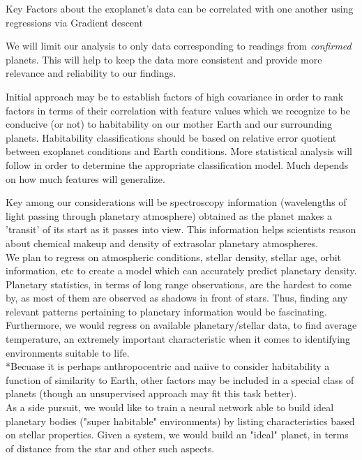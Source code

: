 \documentclass[12pt]{article}
\begin{document}
Key Factors about the exoplanet's data can be correlated with one another using regressions via Gradient descent

We will limit our analysis to only data corresponding to readings from \emph{confirmed} planets. This will help to keep the data more consistent and provide more relevance and reliability to our findings.

Initial approach may be to establish factors of high covariance in order to rank factors in terms of their correlation with feature values which we recognize to be conducive (or not) to habitability on our mother Earth and our surrounding planets. Habitability classifications should be based on relative error quotient between exoplanet conditions and Earth conditions. More statistical analysis will follow in order to determine the appropriate classification model. Much depends on how much  features will generalize.

Key among our considerations will be spectroscopy information (wavelengths of light passing through planetary atmosphere) obtained as the planet makes a 'transit' of its start as it passes into view. This information helps scientists reason about chemical makeup and density of extrasolar planetary atmospheres.
\\
\indent We plan to regress on atmospheric conditions, stellar density, stellar age, orbit information, etc to create a model which can accurately predict planetary density. Planetary statistics, in terms of long range observations, are the hardest to come by, as most of them are observed as shadows in front of stars. Thus, finding any relevant patterns pertaining to planetary information would be fascinating. \\
\indent Furthermore, we would regress on available planetary/stellar data, to find average temperature, an extremely important characteristic when it comes to identifying environments suitable to life. 
\\


*Becuase it is perhaps anthropocentric and naiive to consider habitability a function of similarity to Earth, other factors may be included in a special class of planets (though an unsupervised approach may fit this task better). \\
\indent As a side pursuit, we would like to train a neural network able to build ideal planetary bodies ("super habitable" environments) by listing characteristics based on stellar properties. Given a system, we would build an "ideal" planet, in terms of distance from the star and other such aspects.
\end{document}
